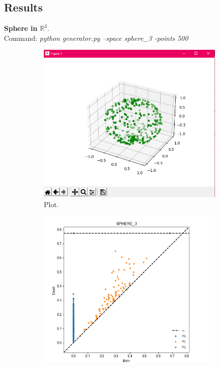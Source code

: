 \documentclass[11pt,a4paper]{report}
\begin{document}
            \subsection*{Results}
            \textbf{Sphere in $\mathbb{R}^3$}.\\
              Command: \textit{python generator.py --space sphere\_3 -points 500}

              \begin{figure}[H]
                \centering
                \begin{subfigure}[b]{0.45\linewidth}
                  \includegraphics[width=\linewidth]{./ripser/on_sphere.PNG}
                  \caption{Plot.}
                \end{subfigure}
                \begin{subfigure}[b]{0.45\linewidth}
                  \includegraphics[width=\linewidth]{./ripser/on_sphere_homology.PNG}

\end{subfigure}
\end{figure}
\end{document}
